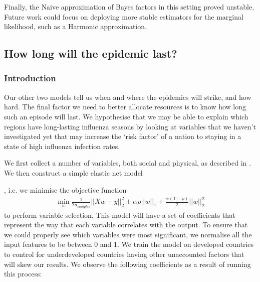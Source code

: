 \documentclass[letterpaper,10pt,english]{sphinxmanual}
\begin{document}
Finally, the Naive approximation of Bayes factors in this setting proved unstable. Future work could focus on deploying more stable estimators for the marginal likelihood, such as a Harmonic approximation.


\subsection{How long will the epidemic last?}
\label{\detokenize{models/how_long:how-long-will-the-epidemic-last}}\label{\detokenize{models/how_long::doc}}

\subsubsection{Introduction}
\label{\detokenize{models/how_long:introduction}}
Our other two models tell us when and where the epidemics will strike, and how hard. The final factor we need to better allocate resources is to know how long such an episode will last. We hypothesise that we may be able to explain which regions have long-lasting influenza seasons by looking at variables that we haven’t investigated yet that may increase the ‘risk factor’ of a nation to staying in a state of high influenza infection rates.

We first collect a number of variables, both social and physical, as described in {\hyperref[\detokenize{datasets:datasets}]{}}. We then construct a simple elastic net model %
\begin{footnote}[1]\sphinxAtStartFootnote
{}
%
\end{footnote} , i.e. we minimise the objective function
\begin{equation*}
\begin{split}\min_{w} { \frac{1}{2n_{samples}} ||X w - y||_2 ^ 2 + \alpha \rho ||w||_1 + \frac{\alpha(1-\rho)}{2} ||w||_2 ^ 2}\end{split}
\end{equation*}
to perform variable selection. This model will have a set of coefficients that represent the way that each variable correlates with the output. To ensure that we could properly see which variables were most significant, we normalise all the input features to be between 0 and 1. We train the model on developed countries to control for underdeveloped countries having other unaccounted factors that will skew our results. We observe the following coefficients as a result of running this process:
\end{document}
